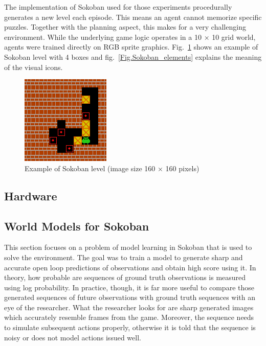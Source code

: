 The implementation of Sokoban\cite{Code.Sokoban} used for those experiments procedurally generates a new level each episode. This means an agent cannot memorize specific puzzles. Together with the planning aspect, this makes for a very challenging environment. While the underlying game logic operates in a 10 × 10 grid world, agents were trained directly on RGB sprite graphics. Fig.~\ref{Fig.Sokoban} shows an example of Sokoban level with 4 boxes and fig.~\ref{Fig.Sokoban_elements} explains the meaning of the visual icons.


\begin{figure}[H]
\includegraphics[]{figures/Sokoban.png}
\caption[Sokoban]{Example of Sokoban level (image size 160 × 160 pixels)}
\label{Fig.Sokoban}
\end{figure}

\subsection{Hardware}


\subsection{World Models for Sokoban}

This section focuses on a problem of model learning in Sokoban that is used to solve the environment. The goal was to train a model to generate sharp and accurate open loop predictions of observations and obtain high score using it. In theory, how probable are sequences of ground truth observations is measured using log probability. In practice, though, it is far more useful to compare those generated sequences of future observations with ground truth sequences with an eye of the researcher. What the researcher looks for are sharp generated images which accurately resemble frames from the game. Moreover, the sequence needs to simulate subsequent actions properly, otherwise it is told that the sequence is noisy or does not model actions issued well.

